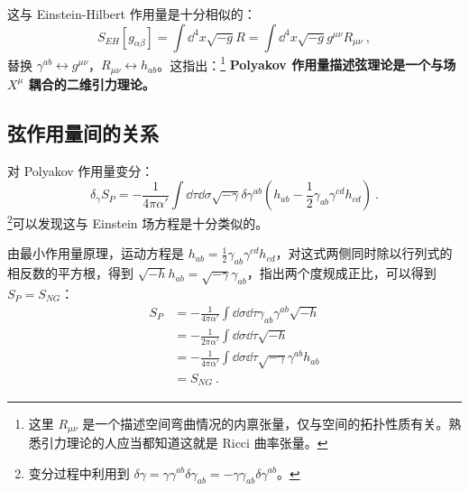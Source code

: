 这与 Einstein-Hilbert 作用量是十分相似的：
\begin{equation}
	S_{EH}[g_{\alpha \beta}] = \int \dd^4 x \sqrt{-g} R = \int \dd^4 x \sqrt{-g} g^{\mu\nu} R_{\mu\nu} ~,
\end{equation}
替换 $\gamma^{ab} \leftrightarrow g^{\mu\nu}$，$R_{\mu\nu} \leftrightarrow h_{ab}$。这指出：\footnote{这里 $R_{\mu\nu}$ 是一个描述空间弯曲情况的内禀张量，仅与空间的拓扑性质有关。熟悉引力理论的人应当都知道这就是 Ricci 曲率张量。}
	\textbf{Polyakov 作用量描述弦理论是一个与场 $X^\mu$ 耦合的二维引力理论。}

\subsection{弦作用量间的关系}
对 Polyakov 作用量变分：
\begin{equation}
	\delta_{\gamma} S_P = -\frac{1}{4\pi \alpha'} \int \dd \tau \dd \sigma \sqrt{-\gamma} \delta \gamma^{ab} \left(h_{ab} - \frac{1}{2} \gamma_{ab} \gamma^{cd} h_{cd}\right) ~.
\end{equation}
\footnote{变分过程中利用到 $\delta \gamma = \gamma \gamma^{ab} \delta \gamma_{ab} = -\gamma \gamma_{ab} \delta \gamma^{ab}$。}可以发现这与 Einstein 场方程是十分类似的。

由最小作用量原理，运动方程是 $h_{ab} = \frac{1}{2} \gamma_{ab} \gamma^{cd} h_{cd}$，对这式两侧同时除以行列式的相反数的平方根，得到 $\sqrt{-h} h_{ab} = \sqrt{-\gamma} \gamma_{ab}$，指出两个度规成正比，可以得到 $S_P = S_{NG}$：
\begin{equation}
	\begin{aligned}
		S_P &= -\frac{1}{4 \pi \alpha'} \int \dd \sigma \dd \tau \gamma_{ab} \gamma^{ab} \sqrt{-h} \\ 
		&= -\frac{1}{2\pi \alpha'} \int \dd \sigma \dd\tau \sqrt{-h} \\ 
		&= -\frac{1}{4\pi\alpha'} \int \dd \sigma \dd \tau \sqrt{-\gamma} \gamma^{ab} h_{ab} \\
		&= S_{NG} ~.
	\end{aligned}
\end{equation}

